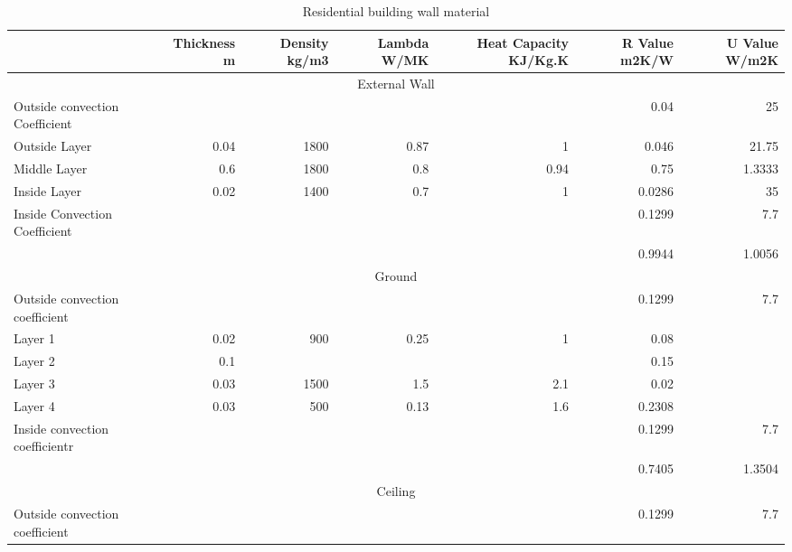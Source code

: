 \documentclass[11pt, a4paper]{article}
\theoremstyle{definition}
\begin{document}
			\newpage
			\begin{table}[h!]
			  \centering
			\caption{Residential building wall material}
			    \begin{tabular}{rrrrrrr}
			    \toprule
			         & \multicolumn{1}{p{3.93em}}{Thickness m} & \multicolumn{1}{p{3.07em}}{Density kg/m3} & \multicolumn{1}{p{3.145em}}{Lambda W/MK} & \multicolumn{1}{p{3.57em}}{Heat Capacity KJ/Kg.K} & \multicolumn{1}{p{3.355em}}{R Value m2K/W} & \multicolumn{1}{p{3.355em}}{U Value W/m2K} \\
			    \midrule
			    \multicolumn{7}{c}{External Wall} \\
			    \midrule
			    \multicolumn{1}{l}{Outside convection Coefficient} &      &      &      &      & 0.04 & 25 \\
			    \multicolumn{1}{l}{Outside Layer} & 0.04 & 1800 & 0.87 & 1    & 0.046 & 21.75 \\
			    \multicolumn{1}{l}{Middle Layer} & 0.6  & 1800 & 0.8  & 0.94 & 0.75 & 1.3333 \\
			    \multicolumn{1}{l}{Inside Layer} & 0.02 & 1400 & 0.7  & 1    & 0.0286 & 35 \\
			    \multicolumn{1}{l}{Inside Convection Coefficient} &      &      &      &      & 0.1299 & 7.7 \\
			         &      &      &      &      & 0.9944 & 1.0056 \\
			    \midrule
			    \multicolumn{7}{c}{Ground} \\
			    \midrule
			    \multicolumn{1}{l}{Outside convection coefficient} &      &      &      &      & 0.1299 & 7.7 \\
			    \multicolumn{1}{l}{Layer 1} & 0.02 & 900  & 0.25 & 1    & 0.08 &  \\
			    \multicolumn{1}{l}{Layer 2} & 0.1  &      &      &      & 0.15 &  \\
			    \multicolumn{1}{l}{Layer 3} & 0.03 & 1500 & 1.5  & 2.1  & 0.02 &  \\
			    \multicolumn{1}{l}{Layer 4} & 0.03 & 500  & 0.13 & 1.6  & 0.2308 &  \\
			    \multicolumn{1}{l}{Inside convection coefficientr} &      &      &      &      & 0.1299 & 7.7 \\
			         &      &      &      &      & 0.7405 & 1.3504 \\
			    \midrule
			    \multicolumn{7}{c}{Ceiling} \\
			    \midrule
			    \multicolumn{1}{l}{Outside convection coefficient} &      &      &      &      & 0.1299 & 7.7 \\

\end{tabular}
\end{table}
\end{document}
